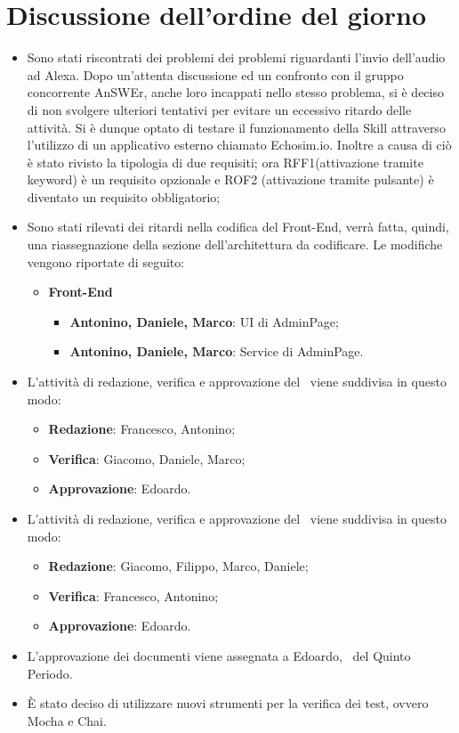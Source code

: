 \documentclass[../verbale-2017-03-31.tex]{subfiles}
\begin{document}
	\section{Discussione dell'ordine del giorno}
	\begin{itemize}
		\item Sono stati riscontrati dei problemi dei problemi riguardanti l'invio dell'audio ad Alexa. Dopo un'attenta discussione ed un confronto con il gruppo concorrente AnSWEr, anche loro incappati nello stesso problema, si è deciso di non svolgere ulteriori tentativi per evitare un eccessivo ritardo delle attività. Si è dunque optato di testare il funzionamento della Skill attraverso l'utilizzo di un applicativo esterno chiamato Echosim.io. Inoltre a causa di ciò è stato rivisto la tipologia di due requisiti; ora RFF1(attivazione tramite keyword) è un requisito opzionale e ROF2 (attivazione tramite pulsante) è diventato un requisito obbligatorio;
		\item Sono stati rilevati dei ritardi nella codifica del Front-End, verrà fatta, quindi, una riassegnazione della sezione dell'architettura da codificare. Le modifiche vengono riportate di seguito:
			\begin{itemize}
				\item \textbf{Front-End}
					\begin{itemize}
						\item \textbf{Antonino, Daniele, Marco}: UI di AdminPage;
						\item \textbf{Antonino, Daniele, Marco}: Service di AdminPage.
					\end{itemize}
			\end{itemize}
		\item L'attività di redazione, verifica e approvazione del \manualeutente\ viene suddivisa in questo modo:
			\begin{itemize}
				\item \textbf{Redazione}: Francesco, Antonino;
				\item \textbf{Verifica}: Giacomo, Daniele, Marco;
				\item \textbf{Approvazione}: Edoardo.
			\end{itemize}
		\item L'attività di redazione, verifica e approvazione del \manualesviluppatore\ viene suddivisa in questo modo:
			\begin{itemize}
				\item \textbf{Redazione}: Giacomo, Filippo, Marco, Daniele;
				\item \textbf{Verifica}: Francesco, Antonino;
				\item \textbf{Approvazione}: Edoardo.
			\end{itemize}
		\item L'approvazione dei documenti viene assegnata a Edoardo, \responsabilediprogetto\ del Quinto Periodo.
		\item È stato deciso di utilizzare nuovi strumenti per la verifica dei test, ovvero Mocha e Chai.
	\end{itemize}
\end{document}

